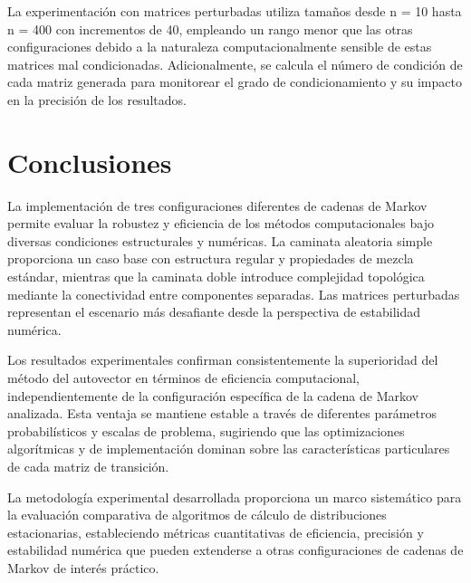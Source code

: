 La experimentación con matrices perturbadas utiliza tamaños desde n = 10 hasta n = 400 con incrementos de 40, empleando un rango menor que las otras configuraciones debido a la naturaleza computacionalmente sensible de estas matrices mal condicionadas. Adicionalmente, se calcula el número de condición de cada matriz generada para monitorear el grado de condicionamiento y su impacto en la precisión de los resultados.

\section{Conclusiones}

La implementación de tres configuraciones diferentes de cadenas de Markov permite evaluar la robustez y eficiencia de los métodos computacionales bajo diversas condiciones estructurales y numéricas. La caminata aleatoria simple proporciona un caso base con estructura regular y propiedades de mezcla estándar, mientras que la caminata doble introduce complejidad topológica mediante la conectividad entre componentes separadas. Las matrices perturbadas representan el escenario más desafiante desde la perspectiva de estabilidad numérica.

Los resultados experimentales confirman consistentemente la superioridad del método del autovector en términos de eficiencia computacional, independientemente de la configuración específica de la cadena de Markov analizada. Esta ventaja se mantiene estable a través de diferentes parámetros probabilísticos y escalas de problema, sugiriendo que las optimizaciones algorítmicas y de implementación dominan sobre las características particulares de cada matriz de transición.

La metodología experimental desarrollada proporciona un marco sistemático para la evaluación comparativa de algoritmos de cálculo de distribuciones estacionarias, estableciendo métricas cuantitativas de eficiencia, precisión y estabilidad numérica que pueden extenderse a otras configuraciones de cadenas de Markov de interés práctico.